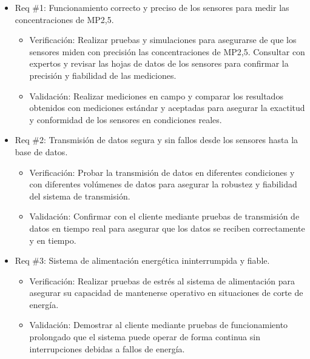 \begin{itemize} 
\item Req \#1: Funcionamiento correcto y preciso de los sensores para medir las concentraciones de MP2,5.

\begin{itemize}
	\item Verificación: Realizar pruebas y simulaciones para asegurarse de que los sensores miden con precisión las concentraciones de MP2,5. Consultar con expertos y revisar las hojas de datos de los sensores para confirmar la precisión y fiabilidad de las mediciones.
	\item Validación: Realizar mediciones en campo y comparar los resultados obtenidos con mediciones estándar y aceptadas para asegurar la exactitud y conformidad de los sensores en condiciones reales.
\end{itemize}

\item Req \#2: Transmisión de datos segura y sin fallos desde los sensores hasta la base de datos.

\begin{itemize}
	\item Verificación: Probar la transmisión de datos en diferentes condiciones y con diferentes volúmenes de datos para asegurar la robustez y fiabilidad del sistema de transmisión.
	\item Validación: Confirmar con el cliente mediante pruebas de transmisión de datos en tiempo real para asegurar que los datos se reciben correctamente y en tiempo.
\end{itemize}

\item Req \#3: Sistema de alimentación energética ininterrumpida y fiable.

\begin{itemize}
	\item Verificación: Realizar pruebas de estrés al sistema de alimentación para asegurar su capacidad de mantenerse operativo en situaciones de corte de energía.
	\item Validación: Demostrar al cliente mediante pruebas de funcionamiento prolongado que el sistema puede operar de forma continua sin interrupciones debidas a fallos de energía.
\end{itemize}



\end{itemize}

